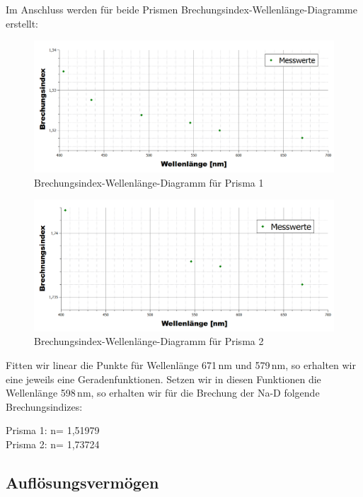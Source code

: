\documentclass[fontsize=12pt]{scrartcl}
\begin{document}
\newpage
\noindent
Im Anschluss werden für beide Prismen Brechungsindex-Wellenlänge-Diagramme erstellt:
\begin{figure}[h]
\centering
\includegraphics[scale=0.4]{Graphik/Prisma1}
\caption{Brechungsindex-Wellenlänge-Diagramm für Prisma 1}
\end{figure}
\begin{figure}[h]
\centering
\includegraphics[scale=0.4]{Graphik/Prisma2}
\caption{Brechungsindex-Wellenlänge-Diagramm für Prisma 2 }
\end{figure}
\newpage
\noindent
Fitten wir linear die Punkte für Wellenlänge 671\,nm und 579\,nm, so erhalten wir eine jeweils eine Geradenfunktionen. Setzen wir in diesen Funktionen die Wellenlänge 598\,nm, so erhalten wir für die Brechung der Na-D folgende Brechungsindizes:\\
\begin{center}
Prisma 1: 	n= 1,51979 \\
Prisma 2:	n= 1,73724
\end{center}

\subsection{Auflösungsvermögen}
\end{document}
